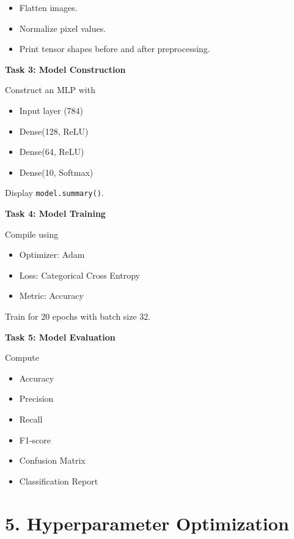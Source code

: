 \documentclass[11pt]{article}
\begin{document}
\begin{itemize}
\item Flatten images.
\item Normalize pixel values.
\item Print tensor shapes before and after preprocessing.
\end{itemize}

\bigskip

\textbf{Task 3: Model Construction}

Construct an MLP with

\begin{itemize}
\item Input layer (784)
\item Dense(128, ReLU)
\item Dense(64, ReLU)
\item Dense(10, Softmax)
\end{itemize}

Display \texttt{model.summary()}.

\bigskip

\textbf{Task 4: Model Training}

Compile using

\begin{itemize}
\item Optimizer: Adam
\item Loss: Categorical Cross Entropy
\item Metric: Accuracy
\end{itemize}

Train for 20 epochs with batch size 32.

\bigskip

\textbf{Task 5: Model Evaluation}

Compute

\begin{itemize}
\item Accuracy
\item Precision
\item Recall
\item F1-score
\item Confusion Matrix
\item Classification Report
\end{itemize}


\section*{5. Hyperparameter Optimization}
\end{document}
